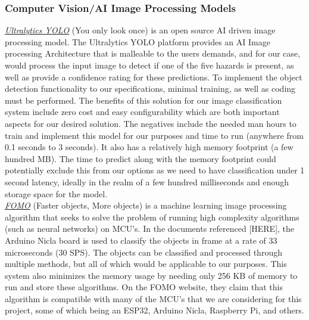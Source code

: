 \subsubsection{Computer Vision/AI Image Processing Models}
\underline{\textit{Ultralytics YOLO}} (You only look once) is an open source AI driven image processing model. The Ultralytics YOLO platform provides an AI Image processing Architecture that is malleable to the users demands, and for our case, would process the input image to detect if one of the five hazards is present, as well as provide a confidence rating for these predictions. To implement the object detection functionality to our specifications, minimal training, as well as coding must be performed. The benefits of this solution for our image classification system include zero cost and easy configurability which are both important aspects for our desired solution. The negatives include the needed man hours to train and implement this model for our purposes and time to run (anywhere from 0.1 seconds to 3 seconds). It also has a relatively high memory footprint (a few hundred MB). The time to predict along with the memory footprint could potentially exclude this from our options as we need to have classification under 1 second latency, ideally in the realm of a few hundred milliseconds and enough storage space for the model. \\

\noindent \underline{\textit{FOMO}} (Faster objects, More objects) is a machine learning image processing algorithm that seeks to solve the problem of running high complexity algorithms (such as neural networks) on MCU's. In the documents referenced [HERE], the Arduino Nicla board is used to classify the objects in frame at a rate of 33 microseconds (30 SPS). The objects can be classified and processed through multiple methods, but all of which would be applicable to our purposes. This system also minimizes the memory usage by needing only 256 KB of memory to run and store these algorithms. On the FOMO website, they claim that this algorithm is compatible with many of the MCU's that we are considering for this project, some of which being an ESP32, Arduino Nicla, Raspberry Pi, and others. \\

